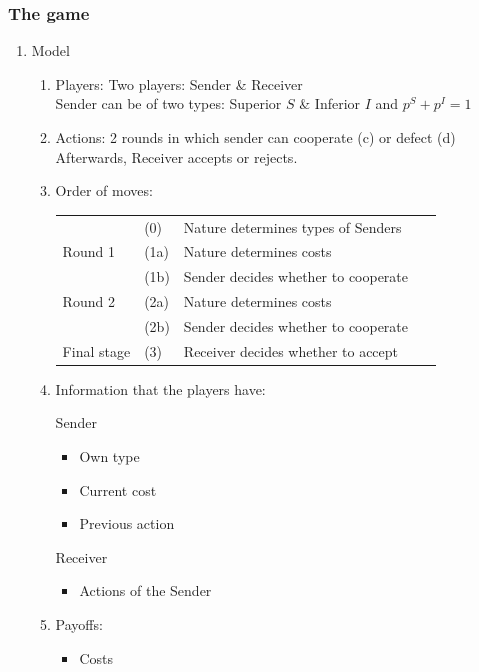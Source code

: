 \documentclass[11pt]{article}
\theoremstyle{plainCl1}
\begin{document}
\subsubsection{The game}

\begin{enumerate}[label={(\alph*)}]
\item Model
	\begin{enumerate}[label={(\arabic*)}]
    	\item Players: Two players: Sender \& Receiver\\
		Sender can be of two types: Superior $S$ \& Inferior $I$ and $p^S + p^I = 1 $
    	\item Actions: 2 rounds in which sender can cooperate (c) or defect (d)\\
		Afterwards, Receiver accepts or rejects.
   	\item Order of moves: 
		\begin{table}[h]
		\centering
		\begin{tabular}{llll}
		            & (0)  & Nature determines types of Senders   &   \\
		Round 1     & (1a) & Nature determines costs              &   \\
		            & (1b) & Sender decides whether to cooperate~ &   \\
		Round 2     & (2a) & Nature determines costs              &   \\
		            & (2b) & Sender decides whether to cooperate  &   \\
		Final stage & (3)  & Receiver decides whether to accept   &  
		\end{tabular}
		\end{table}
	\item Information that the players have:
		\begin{multicols}{2}
		Sender
		\begin{itemize}
		\item Own type
		\item Current cost
		\item Previous action
		\end{itemize}
		\columnbreak
		Receiver
		\begin{itemize}
		\item Actions of the Sender
		\end{itemize}
		\end{multicols}
		\item Payoffs:
			\begin{itemize}
			\item Costs

\end{itemize}
\end{enumerate}
\end{enumerate}
\end{document}
